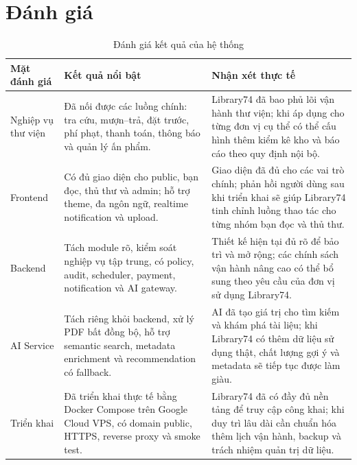 \section{Đánh giá}
\begin{table}[H]
\centering
\small %
\setlength{\tabcolsep}{6pt} %
\renewcommand{\arraystretch}{1.3} %

\begin{tabularx}{\textwidth}{|p{2.5cm}|X|X|}
\hline
\textbf{Mặt đánh giá} & \textbf{Kết quả nổi bật} & \textbf{Nhận xét thực tế} \\
\hline
Nghiệp vụ thư viện &
Đã nối được các luồng chính: tra cứu, mượn--trả, đặt trước, phí phạt, thanh toán, thông báo và quản lý ấn phẩm. &
Library74 đã bao phủ lõi vận hành thư viện; khi áp dụng cho từng đơn vị cụ thể có thể cấu hình thêm kiểm kê kho và báo cáo theo quy định nội bộ. \\
\hline
Frontend &
Có đủ giao diện cho public, bạn đọc, thủ thư và admin; hỗ trợ theme, đa ngôn ngữ, realtime notification và upload. &
Giao diện đã đủ cho các vai trò chính; phản hồi người dùng sau khi triển khai sẽ giúp Library74 tinh chỉnh luồng thao tác cho từng nhóm bạn đọc và thủ thư. \\
\hline
Backend &
Tách module rõ, kiểm soát nghiệp vụ tập trung, có policy, audit, scheduler, payment, notification và AI gateway. &
Thiết kế hiện tại đủ rõ để bảo trì và mở rộng; các chính sách vận hành nâng cao có thể bổ sung theo yêu cầu của đơn vị sử dụng Library74. \\
\hline
AI Service &
Tách riêng khỏi backend, xử lý PDF bất đồng bộ, hỗ trợ semantic search, metadata enrichment và recommendation có fallback. &
AI đã tạo giá trị cho tìm kiếm và khám phá tài liệu; khi Library74 có thêm dữ liệu sử dụng thật, chất lượng gợi ý và metadata sẽ tiếp tục được làm giàu. \\
\hline
Triển khai &
Đã triển khai thực tế bằng Docker Compose trên Google Cloud VPS, có domain public, HTTPS, reverse proxy và smoke test. &
Library74 đã có đầy đủ nền tảng để truy cập công khai; khi duy trì lâu dài cần chuẩn hóa thêm lịch vận hành, backup và trách nhiệm quản trị dữ liệu. \\
\hline
\end{tabularx}
\caption{Đánh giá kết quả của hệ thống}
\label{tab:evaluation_strength_weakness}
\end{table}

